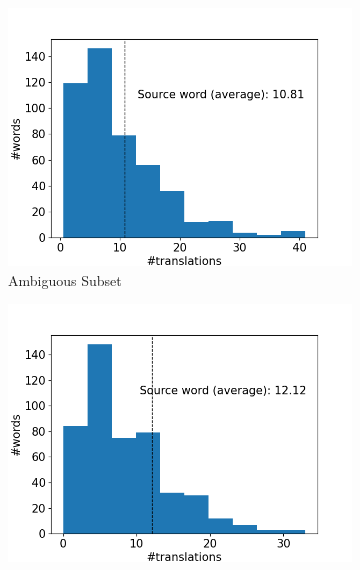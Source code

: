 
\begin{figure}[!htb]
     \centering
     
     \begin{subfigure}{0.49\textwidth}
         \centering
         \includegraphics[width=\textwidth]{figures/alignment/align_100/word_translations_original.png}
         \caption{Ambiguous Subset}
     \end{subfigure}
     \hfill
     \begin{subfigure}{0.49\textwidth}
         \centering
         \includegraphics[width=\textwidth]{figures/alignment/align_100/word_translations_male.png}

\end{subfigure}
\end{figure}
